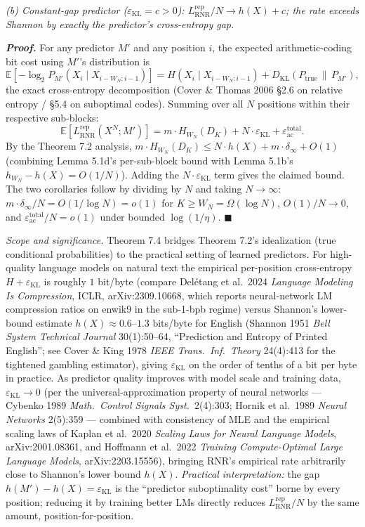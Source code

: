 \documentclass[
]{article}
\begin{document}
\emph{(b) Constant-gap predictor ($\varepsilon_{\mathrm{KL}} = c > 0$):
$L^{\mathrm{rep}}_{\mathrm{RNR}} / N \to h(X) + c$; the rate exceeds
Shannon by exactly the predictor's cross-entropy gap.}

\emph{\textbf{Proof.}} For any predictor $M'$ and any position $i$,
the expected arithmetic-coding bit cost using $M'$'s distribution is
\[
\mathbb{E}[-\log_2 P_{M'}(X_i \mid X_{i-W_N : i-1})]
= H(X_i \mid X_{i-W_N : i-1})
  + D_{\mathrm{KL}}(P_{\mathrm{true}} \,\|\, P_{M'}),
\]
the exact cross-entropy decomposition (Cover \& Thomas 2006 §2.6 on
relative entropy / §5.4 on suboptimal codes). Summing
over all $N$ positions within their respective sub-blocks:
\[
\mathbb{E}[L^{\mathrm{rep}}_{\mathrm{RNR}}(X^N; M')]
= m \cdot H_{W_N}(D_K) + N \cdot \varepsilon_{\mathrm{KL}} + \varepsilon_{\mathrm{ac}}^{\mathrm{total}}.
\]
By the Theorem 7.2 analysis,
$m \cdot H_{W_N}(D_K) \leq N \cdot h(X) + m \cdot \delta_\infty + O(1)$
(combining Lemma 5.1d's per-sub-block bound with Lemma 5.1b's
$h_{W_N} - h(X) = O(1/N)$). Adding the $N \cdot \varepsilon_{\mathrm{KL}}$
term gives the claimed bound. The two corollaries follow by dividing
by $N$ and taking $N \to \infty$: $m \cdot \delta_\infty / N = O(1/\log N) =
o(1)$ for $K \geq W_N = \Omega(\log N)$, $O(1)/N \to 0$, and
$\varepsilon_{\mathrm{ac}}^{\mathrm{total}} / N = o(1)$ under bounded
$\log(1/\eta)$.
\hfill$\blacksquare$

\emph{Scope and significance.} Theorem 7.4 bridges Theorem 7.2's
idealization (true conditional probabilities) to the practical setting
of learned predictors. For high-quality language models on natural text
the empirical per-position cross-entropy $H + \varepsilon_{\mathrm{KL}}$
is roughly $1$ bit/byte (compare Del{\'e}tang et al.\ 2024
\emph{Language Modeling Is Compression}, ICLR, arXiv:2309.10668, which
reports neural-network LM compression ratios on enwik9 in the
sub-1-bpb regime) versus Shannon's lower-bound estimate
$h(X) \approx 0.6$--$1.3$ bits/byte for English (Shannon 1951
\emph{Bell System Technical Journal} 30(1):50--64, ``Prediction and
Entropy of Printed English''; see Cover \& King 1978
\emph{IEEE Trans.\ Inf.\ Theory} 24(4):413 for the tightened gambling
estimator), giving $\varepsilon_{\mathrm{KL}}$ on the order of tenths
of a bit per byte in practice. As predictor quality improves with model
scale and training data, $\varepsilon_{\mathrm{KL}} \to 0$ (per the
universal-approximation property of neural networks
--- Cybenko 1989 \emph{Math.\ Control Signals Syst.}\ 2(4):303;
Hornik et al.\ 1989 \emph{Neural Networks} 2(5):359 --- combined with
consistency of MLE and the empirical scaling laws of Kaplan et al.\
2020 \emph{Scaling Laws for Neural Language Models}, arXiv:2001.08361,
and Hoffmann et al.\ 2022 \emph{Training Compute-Optimal Large Language
Models}, arXiv:2203.15556), bringing RNR's empirical rate arbitrarily
close to Shannon's lower bound $h(X)$. \emph{Practical interpretation:}
the gap $h(M') - h(X) = \varepsilon_{\mathrm{KL}}$ is the ``predictor
suboptimality cost'' borne by every position; reducing it by training
better LMs directly reduces $L^{\mathrm{rep}}_{\mathrm{RNR}}/N$ by the
same amount, position-for-position.
\end{document}
